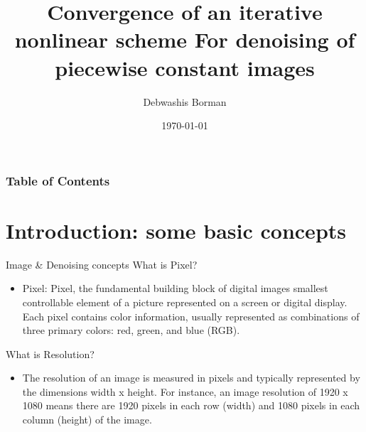 \documentclass{beamer}
\title{Convergence of an iterative nonlinear scheme
For denoising of piecewise constant images}
\subtitle{}
\author{Debwashis Borman}
\institute{Universität Göttingen}
\date{\today}
\begin{document}
\begin{frame}[plain]
    \titlepage
\end{frame}


{
\begin{frame}
    \frametitle{Table of Contents}
    \tableofcontents
\end{frame}
}


\section{Introduction: some basic concepts}

\begin{frame}[t]{Image \& Denoising concepts}
 What is Pixel?
    \begin{itemize}
        \item Pixel:  Pixel, the fundamental building block of digital images smallest controllable element of a picture represented on a screen or digital display.
        Each pixel contains color information, usually represented as combinations of three primary colors: red, green, and blue (RGB). 
    \end{itemize}
    What is Resolution?
    \begin{itemize}
        \item The resolution of an image is measured in pixels and typically represented by the dimensions width x height. For instance, an image resolution of 1920 x 1080 means there are 1920 pixels in each row (width) and 1080 pixels in each column (height) of the image.
    \end{itemize}
\end{frame}
\end{document}
